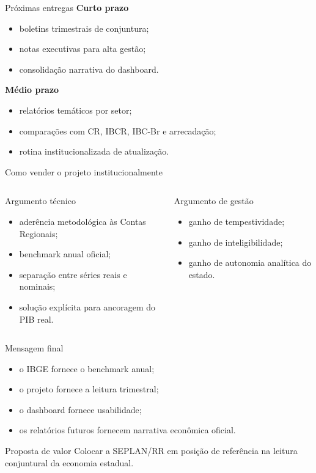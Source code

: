 \documentclass[aspectratio=169,11pt]{beamer}
\begin{document}
\begin{frame}{Próximas entregas}
\textbf{Curto prazo}
\begin{itemize}
  \item boletins trimestrais de conjuntura;
  \item notas executivas para alta gestão;
  \item consolidação narrativa do dashboard.
\end{itemize}

\textbf{Médio prazo}
\begin{itemize}
  \item relatórios temáticos por setor;
  \item comparações com CR, IBCR, IBC-Br e arrecadação;
  \item rotina institucionalizada de atualização.
\end{itemize}
\end{frame}

\begin{frame}{Como vender o projeto institucionalmente}
\begin{columns}[T]
\begin{block}{Argumento técnico}
\begin{itemize}
  \item aderência metodológica às Contas Regionais;
  \item benchmark anual oficial;
  \item separação entre séries reais e nominais;
  \item solução explícita para ancoragem do PIB real.
\end{itemize}
\end{block}

\begin{block}{Argumento de gestão}
\begin{itemize}
  \item ganho de tempestividade;
  \item ganho de inteligibilidade;
  \item ganho de autonomia analítica do estado.
\end{itemize}
\end{block}
\end{columns}
\end{frame}

\begin{frame}{Mensagem final}
\begin{itemize}
  \item o IBGE fornece o benchmark anual;
  \item o projeto fornece a leitura trimestral;
  \item o dashboard fornece usabilidade;
  \item os relatórios futuros fornecem narrativa econômica oficial.
\end{itemize}

\vspace{0.4cm}
\begin{alertblock}{Proposta de valor}
Colocar a SEPLAN/RR em posição de referência na leitura conjuntural da economia estadual.
\end{alertblock}
\end{frame}
\end{document}

